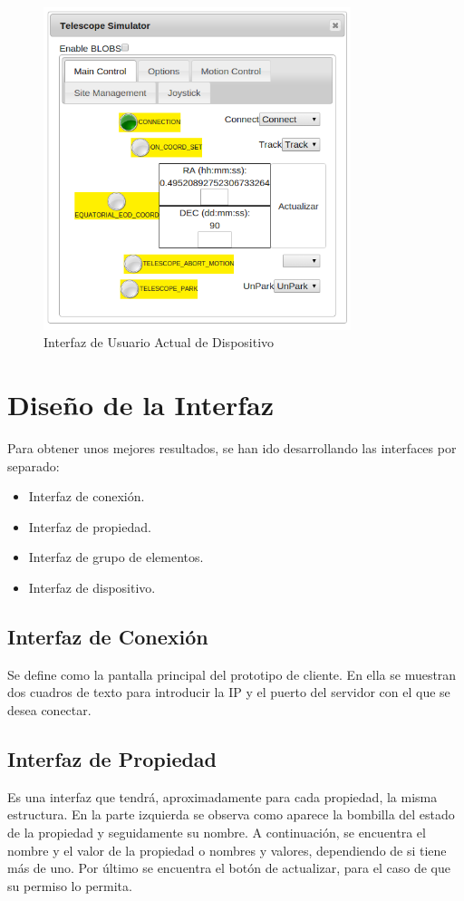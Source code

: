 \begin{figure}[htb]
\centering
\includegraphics[width=0.8\textwidth]{./imagenes/interfazActual}
\caption{Interfaz de Usuario Actual de Dispositivo} \label{fig:interfazActual}
\end{figure}

\section{Diseño de la Interfaz}
Para obtener unos mejores resultados, se han ido desarrollando las interfaces por separado:
\begin{itemize}
  \item Interfaz de conexión.
  \item Interfaz de propiedad.
  \item Interfaz de grupo de elementos.
  \item Interfaz de dispositivo.
\end{itemize}

\subsection{Interfaz de Conexión}
Se define como la pantalla principal del prototipo de cliente. En ella se muestran dos cuadros de texto para introducir la IP y el puerto del servidor con el que se desea conectar.

\subsection{Interfaz de Propiedad}
Es una interfaz que tendrá, aproximadamente para cada propiedad, la misma estructura.
En la parte izquierda se observa como aparece la bombilla del estado de la propiedad y seguidamente su nombre. A continuación, se encuentra el nombre y el valor de la propiedad o nombres y valores, dependiendo de si tiene más de uno. Por último se encuentra el botón de actualizar, para el caso de que su permiso lo permita.\\

